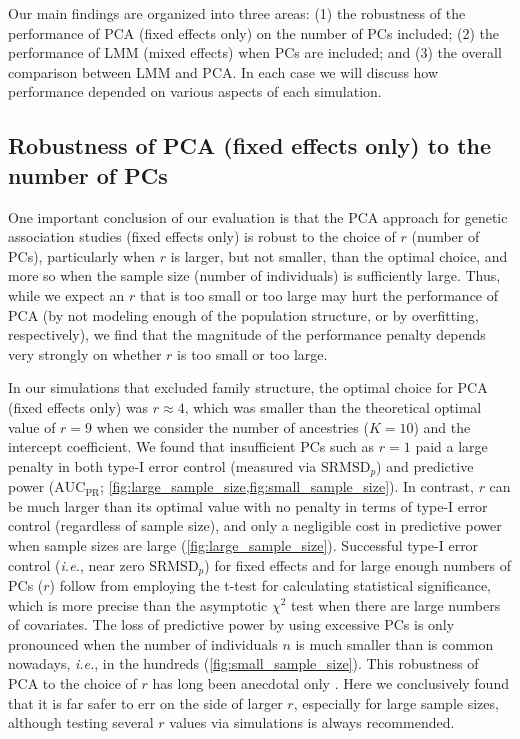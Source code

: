 \documentclass[11pt]{article}
\newcommand{\rmsd}{\text{SRMSD}_p}
\newcommand{\auc}{\text{AUC}_\text{PR}}
\begin{document}

Our main findings are organized into three areas:
(1) the robustness of the performance of PCA (fixed effects only) on the number of PCs included;
(2) the performance of LMM (mixed effects) when PCs are included; and
(3) the overall comparison between LMM and PCA.
In each case we will discuss how performance depended on various aspects of each simulation.

\subsection{Robustness of PCA (fixed effects only) to the number of PCs}

One important conclusion of our evaluation is that the PCA approach for genetic association studies (fixed effects only) is robust to the choice of $r$ (number of PCs), particularly when $r$ is larger, but not smaller, than the optimal choice, and more so when the sample size (number of individuals) is sufficiently large.
Thus, while we expect an $r$ that is too small or too large may hurt the performance of PCA (by not modeling enough of the population structure, or by overfitting, respectively), we find that the magnitude of the performance penalty depends very strongly on whether $r$ is too small or too large.

In our simulations that excluded family structure, the optimal choice for PCA (fixed effects only) was $r \approx 4$, which was smaller than the theoretical optimal value of $r=9$ when we consider the number of ancestries ($K=10$) and the intercept coefficient.
We found that insufficient PCs such as $r = 1$ paid a large penalty in both type-I error control (measured via $\rmsd$) and predictive power ($\auc$; \cref{fig:large_sample_size,fig:small_sample_size}).
In contrast, $r$ can be much larger than its optimal value with no penalty in terms of type-I error control (regardless of sample size), and only a negligible cost in predictive power when sample sizes are large (\cref{fig:large_sample_size}).
Successful type-I error control (\textit{i.e.}, near zero $\rmsd$) for fixed effects and for large enough numbers of PCs ($r$) follow from employing the t-test for calculating statistical significance, which is more precise than the asymptotic $\chi^2$ test when there are large numbers of covariates.
The loss of predictive power by using excessive PCs is only pronounced when the number of individuals $n$ is much smaller than is common nowadays, \textit{i.e.}, in the hundreds (\cref{fig:small_sample_size}).
This robustness of PCA to the choice of $r$ has long been anecdotal only \citep{price_principal_2006, kang_variance_2010}.
Here we conclusively found that it is far safer to err on the side of larger $r$, especially for large sample sizes, although testing several $r$ values via simulations is always recommended.
\end{document}
